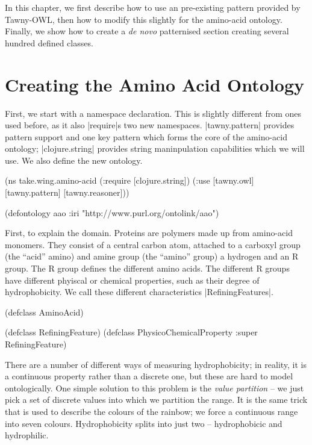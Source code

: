In this chapter, we first describe how to use an pre-existing pattern provided
by Tawny-OWL, then how to modify this slightly for the amino-acid ontology.
Finally, we show how to create a \textit{de novo} patternised section creating
several hundred defined classes.

\section{Creating the Amino Acid Ontology}
\label{sec:creating-amino-acid}

First, we start with a namespace declaration. This is slightly different from
ones used before, as it also |require|s two new namespaces. |tawny.pattern|
provides pattern support and one key pattern which forms the core of the
amino-acid ontology; |clojure.string| provides string maninpulation
capabilities which we will use. We also define the new ontology.

\begin{tawny}
(ns take.wing.amino-acid
  (:require [clojure.string])
  (:use [tawny.owl]
        [tawny.pattern]
        [tawny.reasoner]))

(defontology aao
  :iri "http://www.purl.org/ontolink/aao")
\end{tawny}

First, to explain the domain. Proteins are polymers made up from amino-acid
monomers. They consist of a central carbon atom, attached to a carboxyl group
(the ``acid'' amino) and amine group (the ``amino'' group) a hydrogen and an R
group. The R group defines the different amino acids. The different R groups
have different phyiscal or chemical properties, such as their degree of
hydrophobicity. We call these different characteristics |RefiningFeatures|.

\begin{tawny}
(defclass AminoAcid)

(defclass RefiningFeature)
(defclass PhysicoChemicalProperty :super RefiningFeature)
\end{tawny}

There are a number of different ways of measuring hydrophobicity; in reality,
it is a continuous property rather than a discrete one, but these are hard to
model ontologically. One simple solution to this problem is the \emph{value
  partition} -- we just pick a set of discrete values into which we partition
the range. It is the same trick that is used to describe the colours of the
rainbow; we force a continuous range into seven colours. Hydrophobicity splits
into just two -- hydrophobicic and hydrophilic.

